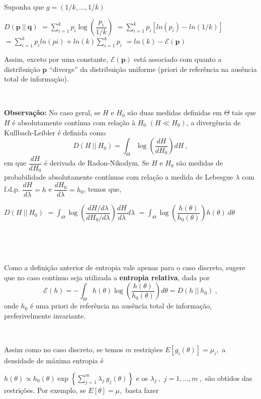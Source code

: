 \documentclass[
]{book}
\begin{document}
\(~\)

Suponha que \(g=(1/k,\ldots,1/k)\)

\(D(\boldsymbol{p}~||~\boldsymbol{q})\)
\(=\displaystyle\sum_{i=1}^{k} p_i\log\left(\dfrac{p_i}{1/k}\right)\)
\(=\displaystyle\sum_{i=1}^{k}p_i\left[ln(p_i)-ln(1/k)\right]\)
\(=\displaystyle\sum_{i=1}^kp_i ln(pi)+ln(k)\sum_{i=1}^k p_i\) \(=ln(k)-\mathcal{E}(\boldsymbol p)\)

Assim, exceto por uma constante, \(\mathcal{E}(\boldsymbol p)\) está associado com quanto a distribuição \(\boldsymbol p\) ``diverge'' da distribuição uniforme (priori de referência na ausência total de informação).

\(~\)

\textbf{Observação:} No caso geral, se \(H\) e \(H_0\) são duas medidas definidas em \(\Theta\) tais que \(H\) é absolutamente contínua com relação à \(H_0\) \((H\ll H_0)\), a divergência de Kullbach-Leibler é definida como\\
\[D(H~||~H_0)=\displaystyle\int_\Theta \log\left(\dfrac{dH}{dH_0}\right)dH~,\]
em que \(\dfrac{dH}{dH_0}\) é derivada de Radon-Nikodym. Se \(H\) e \(H_0\) são medidas de probabilidade absolutamente contínuas com relação a medida de Lebesgue \(\lambda\) com f.d.p. \(\dfrac{dH}{d\lambda}=h\) e \(\dfrac{dH_0}{d\lambda}=h_0\), temos que,

\(D(H~||~H_0)\) \(=\displaystyle\int_\Theta \log\left(\dfrac{dH/d\lambda}{dH_0/d\lambda}\right)\dfrac{dH}{d\lambda}d\lambda\)
\(=\displaystyle\int_\Theta \log\left(\dfrac{h(\theta)}{h_0(\theta)}\right)h(\theta)~d\theta\)

\(~\)

\(~\)

Como a definição anterior de entropia vale apenas para o caso discreto, \citet{Jaynes03} sugere que no caso contínuo seja utilizada a \textbf{entropia relativa}, dada por
\[\mathcal{E}(h)=-\displaystyle\int_\Theta h(\theta)\log\left(\dfrac{h(\theta)}{h_0(\theta)}\right)d\theta=D(h~||~h_0)~,\]
onde \(h_0\) é uma priori de referência na ausência total de informação, preferivelmente invariante.

\(~\)

Assim como no caso discreto, se temos \(m\) restrições \(E[g_i(\theta)]=\mu_i,\) a densidade de máxima entropia é

\(h(\theta)\propto h_0(\theta)\exp\left\{\displaystyle\sum_{j=1}^m\lambda_j~ g_j(\theta)\right\}\) e os \(\lambda_j~,\) \(j=1,\ldots,m~,\) são obtidos das restrições. Por exemplo, se \(E[\theta]=\mu,\) basta fazer
\end{document}
